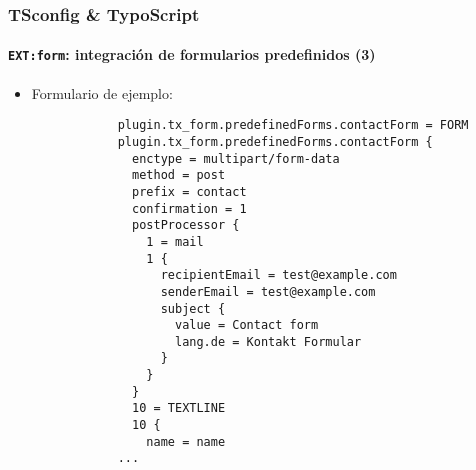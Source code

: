 \begin{frame}[fragile]
	\frametitle{TSconfig \& TypoScript}
	\framesubtitle{\texttt{EXT:form}: integración de formularios predefinidos (3)}

	\lstset{basicstyle=\tiny\ttfamily}

	\begin{itemize}

		\item Formulario de ejemplo:

		\begin{lstlisting}
			plugin.tx_form.predefinedForms.contactForm = FORM
			plugin.tx_form.predefinedForms.contactForm {
			  enctype = multipart/form-data
			  method = post
			  prefix = contact
			  confirmation = 1
			  postProcessor {
			    1 = mail
			    1 {
			      recipientEmail = test@example.com
			      senderEmail = test@example.com
			      subject {
			        value = Contact form
			        lang.de = Kontakt Formular
			      }
			    }
			  }
			  10 = TEXTLINE
			  10 {
			    name = name
			...
		\end{lstlisting}

	\end{itemize}

\end{frame}

